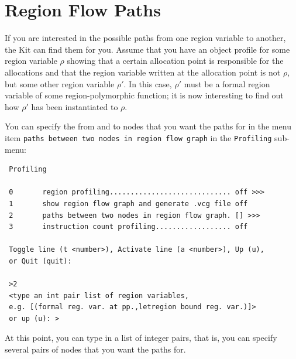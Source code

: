 \documentclass[12pt]{book}
\begin{document}
\section{Region Flow Paths\label{regFlowPath.sec}}
If you are interested in the possible paths
%
from one region variable to another, the Kit can find them for you.
Assume that you have an object profile for some region variable $\rho$
showing that a certain allocation point is responsible for the
allocations and that the region variable written at the allocation
point is not $\rho$, but some other region variable $\rho'$. In this
case, $\rho'$ must be a formal region variable of some
region-polymorphic function; it is now interesting to find out how
$\rho'$ has been instantiated to $\rho$.

You can specify the from and to nodes that you want the paths for in
the menu item
%
{\tt paths between two nodes in region flow graph} in the {\tt Profiling}
sub-menu:
\begin{verbatim}
 Profiling

 0       region profiling............................. off >>>
 1       show region flow graph and generate .vcg file off
 2       paths between two nodes in region flow graph. [] >>>
 3       instruction count profiling.................. off 

 Toggle line (t <number>), Activate line (a <number>), Up (u), 
 or Quit (quit): 

 >2
 <type an int pair list of region variables,
 e.g. [(formal reg. var. at pp.,letregion bound reg. var.)]> 
 or up (u): >
\end{verbatim}

At this point, you can type in a list of integer pairs, that is, you
can specify several pairs of nodes that you want the paths for.
\end{document}

